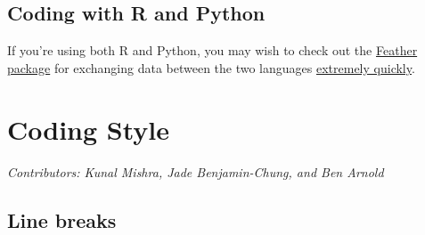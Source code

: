 \documentclass[]{book}
\begin{document}
\hypertarget{coding-with-r-and-python}{%
\section{Coding with R and Python}\label{coding-with-r-and-python}}

If you're using both R and Python, you may wish to check out the \href{https://www.rdocumentation.org/packages/feather/versions/0.3.3}{Feather package} for exchanging data between the two languages \href{https://blog.rstudio.com/2016/03/29/feather/}{extremely quickly}.

\hypertarget{codingstyle}{%
\chapter{Coding Style}\label{codingstyle}}

\emph{Contributors: Kunal Mishra, Jade Benjamin-Chung, and Ben Arnold}

\hypertarget{line-breaks}{%
\section{Line breaks}\label{line-breaks}}
\end{document}
